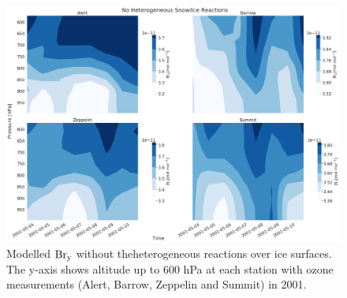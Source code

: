 \begin{figure}
    \centering
    \includegraphics[width = \linewidth]{Chapter6_Results/images/noSnowIce_2001_bry.png}
    \caption{Modelled $\mathrm{Br_y}$ without theheterogeneous reactions over ice surfaces. The y-axis shows altitude up to 600 hPa at each station with ozone measurements (Alert, Barrow, Zeppelin and Summit) in 2001.}
    \label{fig:vert_noSnowIce_bry_2001}
\end{figure}